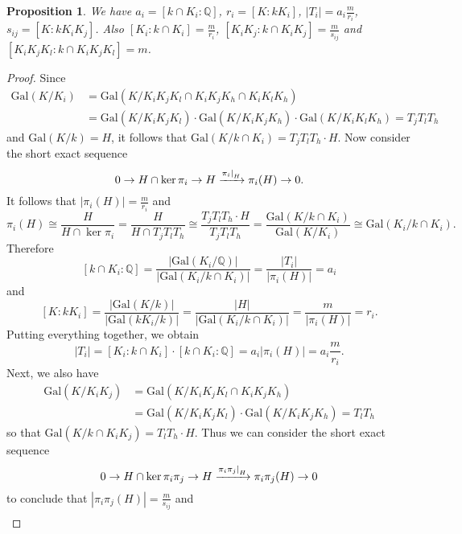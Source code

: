 \documentclass[12pt,a4paper]{article}
\newtheorem{prop}[theorem]{Proposition}
\newcommand{\Q}{\mathbb{Q}}
\newcommand{\Gal}{\mathrm{Gal}}
\newcommand\restr[2]{{%
  \left.\kern-\nulldelimiterspace %
  #1 %
  \right|_{#2} %
  }}
\begin{document}
\begin{prop}\label{degrees}
We have $a_i=[k\cap K_i:\Q]$, $r_i=[K:kK_i]$, $|T_i|=a_i\frac{m}{r_i}$,  $s_{ij}=[K:kK_iK_j]$. Also $[K_i:k\cap K_i]=\frac{m}{r_i}$, $[K_iK_j:k\cap K_iK_j]=\frac{m}{s_{ij}}$ and $[K_iK_jK_l:k\cap K_iK_jK_l]=m$.
\end{prop}
\begin{proof}
Since
\begin{equation*}
\begin{split}
\Gal(K/K_i)&=\Gal(K/K_iK_jK_l\cap K_iK_jK_h\cap K_iK_lK_h)\\
&=\Gal(K/K_iK_jK_l)\cdot \Gal(K/K_iK_jK_h)\cdot \Gal(K/K_iK_lK_h)
= T_jT_lT_h
\end{split}
\end{equation*} 
 and $\Gal(K/k)=H$, it follows that $\Gal(K/k\cap K_i)= T_jT_lT_h\cdot H$. Now consider the short exact sequence %
$$0\to H\cap \ker \pi_i\to H \xrightarrow{\restr{\pi_i}{H}} \pi_i(H)\to 0.$$
It follows that $|\pi_i(H)|=\frac{m}{r_i}$ and $$\pi_i(H)\cong \frac{H}{H\cap \ker \pi_i}=\frac{H}{H\cap T_jT_lT_h}\cong \frac{T_jT_lT_h\cdot H}{T_jT_lT_h}= \frac{\Gal(K/k\cap K_i)}{\Gal(K/K_i)}\cong \Gal(K_i/k\cap K_i).$$
Therefore 
$$[k\cap K_i:\Q]=\frac{|\Gal(K_i/\Q)|}{|\Gal(K_i/k\cap K_i)|}=\frac{|T_i|}{|\pi_i(H)|}=a_i$$
and
$$[K:kK_i]=\frac{|\Gal(K/k)|}{|\Gal(kK_i/k)|}=\frac{|H|}{|\Gal(K_i/k\cap K_i)|}=\frac{m}{|\pi_i(H)|}=r_i.$$
Putting everything together, we obtain $$|T_i|=[K_i:k\cap K_i]\cdot[k\cap K_i:\Q]=a_i|\pi_i(H)|=a_i\frac{m}{r_i}.$$
Next, we also have 
\begin{equation*}
\begin{split}
\Gal(K/K_iK_j)&=\Gal(K/K_iK_jK_l\cap K_iK_jK_h)\\
&=\Gal(K/K_iK_jK_l)\cdot \Gal(K/K_iK_jK_h)= T_lT_h
\end{split}
\end{equation*} 
so that $\Gal(K/k\cap K_iK_j)=T_lT_h\cdot H$. Thus we can consider the short exact sequence 
$$0\to H\cap \ker \pi_i\pi_j\to H \xrightarrow{\restr{\pi_i\pi_j}{H}} \pi_i\pi_j(H)\to 0$$
to conclude that $|\pi_i\pi_j(H)|=\frac{m}{s_{ij}}$ and 
\begin{equation*}
\begin{split}

\end{split}
\end{equation*}
\end{proof}
\end{document}
